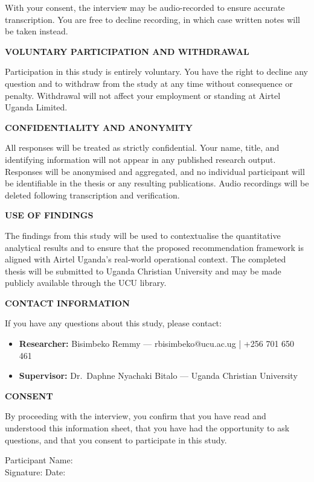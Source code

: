 With your consent, the interview may be audio-recorded to ensure accurate transcription. You are free to decline recording, in which case written notes will be taken instead.

\vspace{0.3cm}
\textbf{VOLUNTARY PARTICIPATION AND WITHDRAWAL}

Participation in this study is entirely voluntary. You have the right to decline any question and to withdraw from the study at any time without consequence or penalty. Withdrawal will not affect your employment or standing at Airtel Uganda Limited.

\vspace{0.3cm}
\textbf{CONFIDENTIALITY AND ANONYMITY}

All responses will be treated as strictly confidential. Your name, title, and identifying information will not appear in any published research output. Responses will be anonymised and aggregated, and no individual participant will be identifiable in the thesis or any resulting publications. Audio recordings will be deleted following transcription and verification.

\vspace{0.3cm}
\textbf{USE OF FINDINGS}

The findings from this study will be used to contextualise the quantitative analytical results and to ensure that the proposed recommendation framework is aligned with Airtel Uganda's real-world operational context. The completed thesis will be submitted to Uganda Christian University and may be made publicly available through the UCU library.

\vspace{0.3cm}
\textbf{CONTACT INFORMATION}

If you have any questions about this study, please contact:

\begin{itemize}
    \item \textbf{Researcher:} Bisimbeko Remmy --- rbisimbeko@ucu.ac.ug | +256 701 650 461
    \item \textbf{Supervisor:} Dr.\ Daphne Nyachaki Bitalo --- Uganda Christian University
\end{itemize}

\vspace{0.5cm}
\textbf{CONSENT}

By proceeding with the interview, you confirm that you have read and understood this information sheet, that you have had the opportunity to ask questions, and that you consent to participate in this study.

\vspace{1cm}
\noindent
Participant Name: \underline{\hspace{7cm}} \\[0.8cm]
Signature: \underline{\hspace{7cm}} \hfill Date: \underline{\hspace{3cm}}
